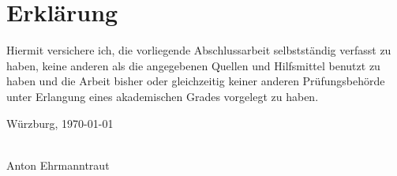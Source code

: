 \printbibliography
\clearpage\strut\thispagestyle{empty}\clearpage

\cleardoublepage
\section*{Erklärung}

Hiermit versichere ich, die vorliegende Abschlussarbeit selbstständig verfasst zu haben, keine anderen als die angegebenen Quellen und Hilfsmittel benutzt zu haben und die Arbeit bisher oder gleichzeitig keiner anderen Prüfungsbehörde unter Erlangung eines akademischen Grades vorgelegt zu haben.

\vspace*{1cm}
\noindent
Würzburg, \today

\vspace*{1cm}
\noindent
\makebox[50mm]{\dotfill}\\
Anton Ehrmanntraut



